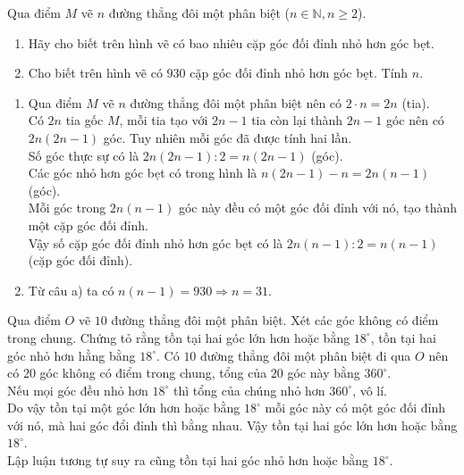 \begin{bt}%
Qua điểm $M$ vẽ $n$ đường thẳng đôi một phân biệt ($n \in \mathbb{N}, n \ge 2$).
\begin{enumerate}
	\item Hãy cho biết trên hình vẽ có bao nhiêu cặp góc đối đỉnh nhỏ hơn góc bẹt.
	\item Cho biết trên hình vẽ có $930$ cặp góc đối đỉnh nhỏ hơn góc bẹt. Tính $n$.
\end{enumerate}
\loigiai
{
\begin{enumerate}
	\item Qua điểm $M$ vẽ $n$ đường thẳng đôi một phân biệt nên có $2 \cdot n=2n$ (tia).\\
	Có $2n$ tia gốc $M$, mỗi tia tạo với $2n-1$ tia còn lại thành $2n-1$ góc nên có $2n(2n-1)$ góc. Tuy nhiên mỗi góc đã được tính hai lần.\\
	Số góc thực sự có là $2n(2n-1):2=n(2n-1)$ (góc).\\
	Các góc nhỏ hơn góc bẹt có trong hình là $n(2n-1)-n=2n(n-1)$ (góc).\\
	Mỗi góc trong $2n(n-1)$ góc này đều có một góc đối đỉnh với nó, tạo thành một cặp góc đối đỉnh.\\
	Vậy số cặp góc đối đỉnh nhỏ hơn góc bẹt có là $2n(n-1):2=n(n-1)$ (cặp góc đối đỉnh).
	\item Từ câu a) ta có $n(n-1)=930 \Rightarrow n=31.$
\end{enumerate}
}
\end{bt}

\begin{bt}%
Qua điểm $O$ vẽ $10$ đường thẳng đôi một phân biệt. Xét các góc không có điểm trong chung. Chứng tỏ rằng tồn tại hai góc lớn hơn hoặc bằng $18^{\circ}$, tồn tại hai góc nhỏ hơn hằng bằng $18^{\circ}$.
\loigiai
{
Có $10$ đường thẳng đôi một phân biệt đi qua $O$ nên có $20$ góc không có điểm trong chung, tổng của $20$ góc này bằng $360^{\circ}$.\\
Nếu mọi góc đều nhỏ hơn $18^{\circ}$ thì tổng của chúng nhỏ hơn $360^{\circ}$, vô lí.\\
Do vậy tồn tại một góc lớn hơn hoặc bằng $18^{\circ}$ mỗi góc này có một góc đối đỉnh với nó, mà hai góc đổi đỉnh thì bằng nhau. Vậy tồn tại hai góc lớn hơn hoặc bằng $18^{\circ}$.\\
Lập luận tương tự suy ra cũng tồn tại hai góc nhỏ hơn hoặc bằng $18^{\circ}$.
}
\end{bt}


